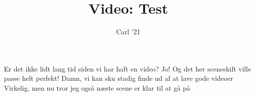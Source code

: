\documentclass[a4paper,11pt]{article}
\title{Video: Test}
\author{Carl '21}
\begin{document}
\maketitle

\begin{sketch}
 Er det ikke lidt lang tid siden vi har haft en video?
 Jo! Og det her sceneskift ville passe helt perfekt!
 Damn, vi kan sku stadig finde ud af at lave gode videoer
 Virkelig, men nu tror jeg også næste scene er klar til at gå på
\end{sketch}
\end{document}
